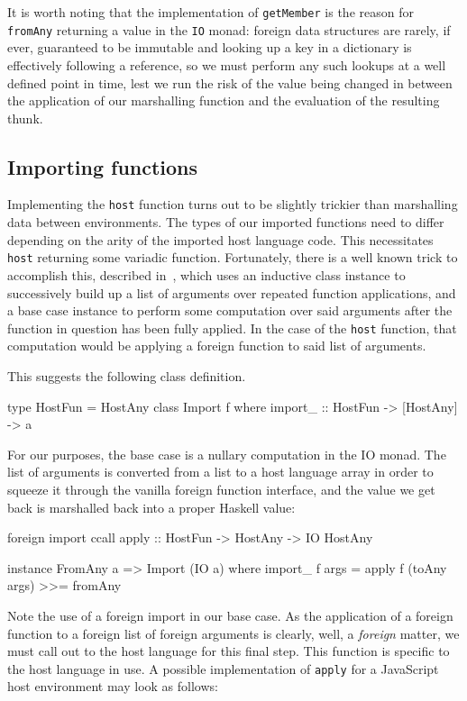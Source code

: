 \documentclass[preprint]{sigplanconf}
\begin{document}
It is worth noting that the implementation of \lstinline!getMember! is
the reason for \lstinline!fromAny! returning a value in the \lstinline!IO!
monad: foreign data structures are rarely, if ever, guaranteed to be immutable
and looking up a key in a dictionary is effectively following a reference,
so we must perform any such lookups at a well defined point in time,
lest we run the risk of the value being changed in between the application
of our marshalling function and the evaluation of the resulting thunk.

\subsection{Importing functions}\label{sec:import}
Implementing the \lstinline!host! function turns out to be slightly trickier
than marshalling data between environments.
The types of our imported functions need to differ depending on the arity of
the imported host language code. This necessitates \lstinline!host! returning
some variadic function. Fortunately, there is a well known trick to accomplish
this, described in\ \cite{printf}, which uses an inductive class instance to
successively build up a list of arguments over repeated function applications,
and a base case instance to perform some computation over said arguments after
the function in question has been fully applied.
In the case of the \lstinline!host! function, that computation would be
applying a foreign function to said list of arguments.

This suggests the following class definition.

\begin{code}
  type HostFun = HostAny
  class Import f where
    import_ :: HostFun -> [HostAny] -> a
\end{code}

For our purposes, the base case is a nullary computation in the IO monad.
The list of arguments is converted from a list to
a host language array in order to squeeze it through the vanilla foreign
function interface, and the value we get back is marshalled back into a proper
Haskell value:

\begin{code}
  foreign import ccall
    apply :: HostFun -> HostAny -> IO HostAny

  instance FromAny a => Import (IO a) where
    import_ f args =
      apply f (toAny args) >>= fromAny
\end{code}

Note the use of a foreign import in our base case. As the application of a
foreign function to a foreign list of foreign arguments is clearly, well, a
\emph{foreign} matter, we must call out to the host language for this final
step.
This function is specific to the host language in use. A possible
implementation of \lstinline!apply! for a JavaScript host environment may look
as follows:
\end{document}
